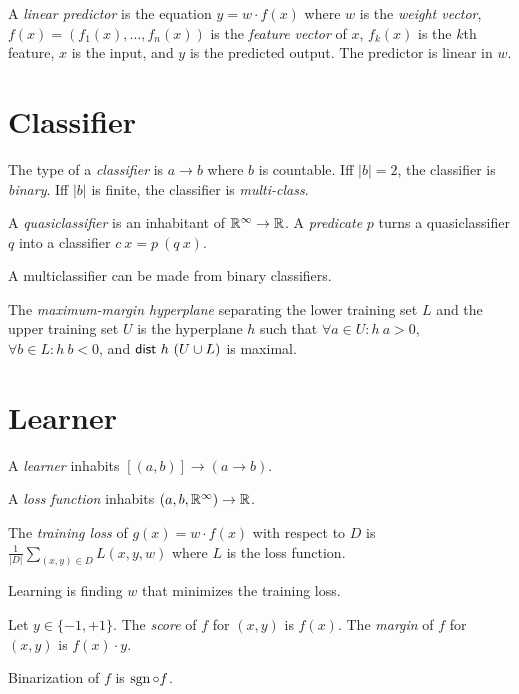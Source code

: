 A
%
%
\emph{linear predictor} is the equation
\(y = w \cdot f(x)\) where \(w\) is the \emph{weight vector},
\(f(x) = (f_1(x),\ldots,f_n(x))\) is the \emph{feature vector} of \(x\),
\(f_k(x)\) is the \(k\)th feature,
\(x\) is the input,
and \(y\) is the predicted output.
The predictor is linear in \(w\).

\section{Classifier}

%
%
%
The type of a \emph{classifier} is \(a \to b\) where \(b\) is countable.
Iff \(|b| = 2\), the classifier is \emph{binary}.
Iff \(|b|\) is finite, the classifier is \emph{multi-class}.

A \emph{quasiclassifier} is an inhabitant of \(\mathbb{R}^\infty \to \mathbb{R}\).
A \emph{predicate} \(p\) turns a quasiclassifier \(q\) into a classifier \(c~x = p~(q~x)\).

A multiclassifier can be made from binary classifiers.

%
%
The \emph{maximum-margin hyperplane} separating
the lower training set \(L\) and the upper training set \(U\)
is the hyperplane \(h\)
such that
\(\forall a \in U : h~a > 0\),
\,\(\forall b \in L : h~b < 0\),
and \(\textsf{dist}~h~(U \cup L)\) is maximal.

\section{Learner}

A
%
\emph{learner} inhabits \([(a,b)] \to (a \to b)\).

A
%
\emph{loss function} inhabits \((a,b,\mathbb{R}^\infty) \to \mathbb{R}\).

The
%
\emph{training loss} of \(g(x) = w \cdot f(x)\) with respect to \(D\)
is \(\frac{1}{|D|} \sum_{(x,y) \in D} L(x,y,w)\)
where \(L\) is the loss function.

Learning is finding \(w\) that minimizes the training loss.

Let \(y \in \{-1,+1\}\).
The
%
\emph{score} of \(f\) for \((x,y)\) is \(f(x)\).
The
%
\emph{margin} of \(f\) for \((x,y)\) is \(f(x) \cdot y\).

Binarization of \(f\) is \(\operatorname{sgn} \circ f\).

